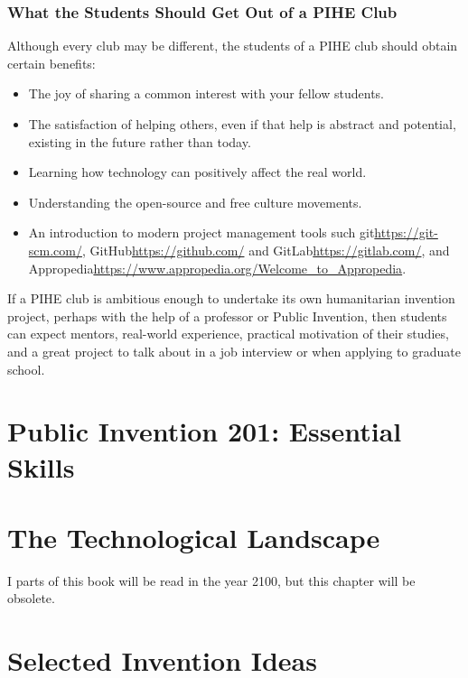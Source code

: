 \documentclass[
	fontsize=10pt, %
	twoside=false, %
	secnumdepth=1, %
]{kaobook}
\begin{document}
\subsection{What the Students Should Get Out of a PIHE Club}

Although every club may be different, the students of a PIHE club should obtain certain benefits:
\begin{itemize}
\item The joy of sharing a common interest with your fellow students.
\item The satisfaction of helping others, even if that help is abstract and potential, existing in the future rather than today.
\item Learning how technology can positively affect the real world.
\item Understanding the open-source and free culture movements.
\item An introduction to modern project management tools such git\url{https://git-scm.com/}, GitHub\url{https://github.com/} and GitLab\url{https://gitlab.com/}, and Appropedia\url{https://www.appropedia.org/Welcome_to_Appropedia}.
\end{itemize}

If a PIHE club is ambitious enough to undertake its own humanitarian invention project, perhaps with the help of a professor or Public Invention, then students can expect mentors, real-world experience, practical motivation of their studies, and a great project to talk about in a job interview or when applying to graduate school.



\chapter{Public Invention 201: Essential Skills}

\chapter{The Technological Landscape}

I parts of this book will be read in the year 2100, but this chapter
will be obsolete.

\chapter{Selected Invention Ideas}
\end{document}
